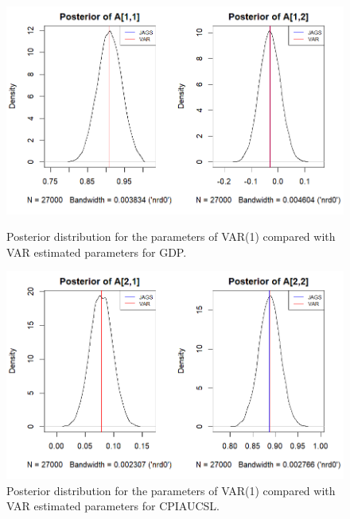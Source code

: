 \begin{figure}[H]
    \centering
    \begin{minipage}{0.49\textwidth}
        \centering
        \includegraphics[width=\textwidth]{images/6-VAR/VAR_posterior_distribution_gdp.png}
        \caption{Posterior distribution for the parameters of VAR(1) compared with VAR estimated parameters for GDP.}
        \label{fig:VAR_gdp_posteriors}
    \end{minipage}\hfill
    \begin{minipage}{0.49\textwidth}
        \centering
        \includegraphics[width=\textwidth]{images/6-VAR/VAR_posterior_distribution_infl.png}
        \caption{Posterior distribution for the parameters of VAR(1) compared with VAR estimated parameters for CPIAUCSL.}
        \label{fig:VAR_infl_posteriors}
    \end{minipage}
\end{figure}